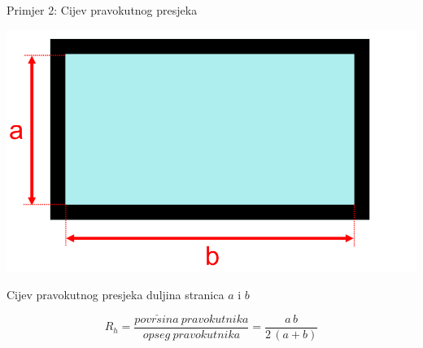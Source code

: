 \documentclass[croatian]{beamer}
\begin{document}
\begin{frame}{Primjer 2: Cijev pravokutnog presjeka}

\begin{center}
\includegraphics[width=0.45\paperwidth]{slike/slika4.PNG}
\par\end{center}
\begin{example}
{Cijev pravokutnog presjeka duljina stranica $a$ i $b$}

\[
R_{h}=\frac{povr\check{s}ina\:pravokutnika}{opseg\:pravokutnika}=\frac{a\,b}{2\,(a+b)}
\]

\end{example}

\end{frame}
\end{document}
